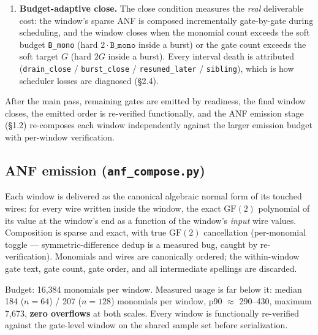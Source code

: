 \documentclass[11pt]{article}
\newcommand{\code}[1]{\texttt{#1}}
\begin{document}
\begin{enumerate}
{  consecutively} (dependencies pulled from the ready heap as needed)
  inside the one window. Hiding is all-or-nothing per value: the first
  touched span commits the value; if any span dies --- a window closed
  mid-burst, or a member was consumed earlier as filler/another burst
  (\code{resumed\_later}) --- \textbf{all sibling intervals of that value
  are killed} (\code{kill\_value}) and their reserved gates are released
  to the filler pool immediately, so no capacity is spent on half-hidden
  values. After each burst, \textbf{contagion} completes any committed
  interval with $\leq 24$ remaining members in place while the window is
  still open.
\item \textbf{Budget-adaptive close.} The close condition measures the
  \emph{real} deliverable cost: the window's sparse ANF is composed
  incrementally gate-by-gate during scheduling, and the window closes when
  the monomial count exceeds the soft budget \code{B\_mono} (hard
  $2\cdot\code{B\_mono}$ inside a burst) or the gate count exceeds the
  soft target $G$ (hard $2G$ inside a burst). Every interval death is
  attributed (\code{drain\_close} / \code{burst\_close} /
  \code{resumed\_later} / \code{sibling}), which is how scheduler losses
  are diagnosed (\S2.4).
\end{enumerate}

After the main pass, remaining gates are emitted by readiness, the final
window closes, the emitted order is re-verified functionally, and the ANF
emission stage (\S1.2) re-composes each window independently against the
larger emission budget with per-window verification.

\subsection{ANF emission (\code{anf\_compose.py})}

Each window is delivered as the canonical algebraic normal form of its
touched wires: for every wire written inside the window, the exact
$\mathrm{GF}(2)$ polynomial of its value at the window's end as a function of
the window's \emph{input} wire values. Composition is sparse and exact, with
true $\mathrm{GF}(2)$ cancellation (per-monomial toggle ---
symmetric-difference dedup is a measured bug, caught by re-verification).
Monomials and wires are canonically ordered; the within-window gate text,
gate count, gate order, and all intermediate spellings are discarded.

Budget: 16{,}384 monomials per window. Measured usage is far below it: median
184 ($n{=}64$) / 207 ($n{=}128$) monomials per window, p90 $\approx$
290--430, maximum 7{,}673, \textbf{zero overflows} at both scales. Every
window is functionally re-verified against the gate-level window on the
shared sample set before serialization.
\end{document}

